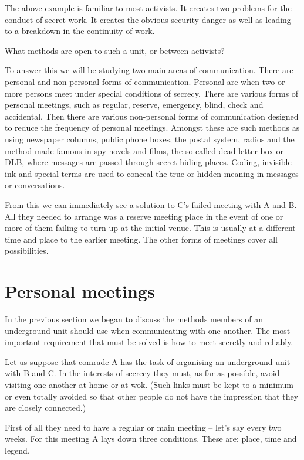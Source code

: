 The above example is familiar to most activists. It creates two problems
for the conduct of secret work. It creates the obvious security danger
as well as leading to a breakdown in the continuity of work.

What methods are open to such a unit, or between activists?

To answer this we will be studying two main areas of communication.
There are personal and non-personal forms of communication. Personal are
when two or more persons meet under special conditions of secrecy. There
are various forms of personal meetings, such as regular, reserve,
emergency, blind, check and accidental. Then there are various
non-personal forms of communication designed to reduce the frequency of
personal meetings. Amongst these are such methods as using newspaper
columns, public phone boxes, the postal system, radios and the method
made famous in spy novels and films, the so-called dead-letter-box or
DLB, where messages are passed through secret hiding places. Coding,
invisible ink and special terms are used to conceal the true or hidden
meaning in messages or conversations.

From this we can immediately see a solution to C's failed meeting with A
and B. All they needed to arrange was a reserve meeting place in the
event of one or more of them failing to turn up at the initial venue.
This is usually at a different time and place to the earlier meeting.
The other forms of meetings cover all possibilities.

\section{Personal meetings}

In the previous section we began to discuss the methods members of an
underground unit should use when communicating with one another. The
most important requirement that must be solved is how to meet secretly
and reliably.

Let us suppose that comrade A has the task of organising an underground
unit with B and C. In the interests of secrecy they must, as far as
possible, avoid visiting one another at home or at wok. (Such links must
be kept to a minimum or even totally avoided so that other people do not
have the impression that they are closely connected.)

First of all they need to have a regular or main meeting -- let's say
every two weeks. For this meeting A lays down three conditions. These
are: place, time and legend.

